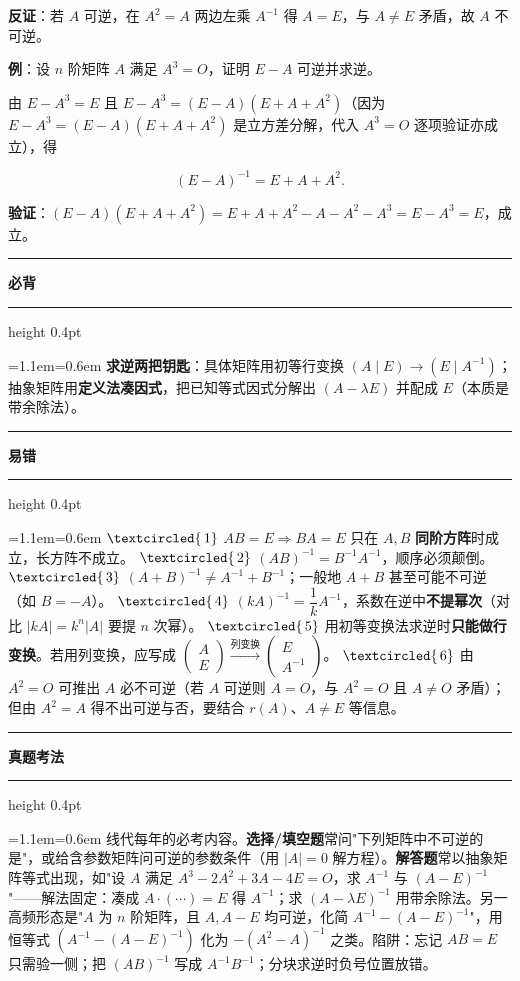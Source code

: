 \documentclass[11pt,openany,UTF8]{ctexbook}
\newcommand{\circled}[1]{\textcircled{\scriptsize\,#1}}
\newcommand{\callouthead}[2]{%
  \par\addvspace{7pt}\noindent
  {\color{#1}\rule[-0.15em]{3pt}{1.05em}}\hspace{0.5em}%
  {\bfseries\color{#1}#2}\par\nobreak\vspace{-0.35em}%
  {\color{rulesep}\hrule height 0.4pt}\nobreak\vspace{0.45em}%
  \begingroup\small\setlength{\parindent}{0pt}%
  \leftskip=1.1em\rightskip=0.6em\noindent\ignorespaces}
\newcommand{\calloutend}{\par\endgroup\addvspace{7pt}}
\newenvironment{callkey}[1]{\callouthead{keybar}{#1}}{\calloutend}
\newenvironment{callwarn}[1]{\callouthead{warnbar}{#1}}{\calloutend}
\newenvironment{callexam}[1]{\callouthead{exambar}{#1}}{\calloutend}
\begin{document}
\textbf{反证}：若 $A$ 可逆，在 $A^2=A$ 两边左乘 $A^{-1}$ 得 $A=E$，与 $A\ne E$ 矛盾，故 $A$ 不可逆。

\textbf{例}：设 $n$ 阶矩阵 $A$ 满足 $A^3=O$，证明 $E-A$ 可逆并求逆。

由 $E-A^3=E$ 且 $E-A^3=(E-A)(E+A+A^2)$（因为 $E-A^3=(E-A)(E+A+A^2)$ 是立方差分解，代入 $A^3=O$ 逐项验证亦成立），得

\[(E-A)^{-1}=E+A+A^2 .\]

\textbf{验证}：$(E-A)(E+A+A^2)=E+A+A^2-A-A^2-A^3=E-A^3=E$，成立。

\begin{callkey}{必背}
\textbf{求逆两把钥匙}：具体矩阵用初等行变换 $(A\mid E)\to(E\mid A^{-1})$；抽象矩阵用\textbf{定义法凑因式}，把已知等式因式分解出 $(A-\lambda E)$ 并配成 $E$（本质是带余除法）。

\end{callkey}

\begin{callwarn}{易错}
$\circled{1}$ $AB=E\Rightarrow BA=E$ 只在 $A,B$ \textbf{同阶方阵}时成立，长方阵不成立。 $\circled{2}$ $(AB)^{-1}=B^{-1}A^{-1}$，顺序必须颠倒。 $\circled{3}$ $(A+B)^{-1}\ne A^{-1}+B^{-1}$；一般地 $A+B$ 甚至可能不可逆（如 $B=-A$）。 $\circled{4}$ $(kA)^{-1}=\dfrac{1}{k}A^{-1}$，系数在逆中\textbf{不提幂次}（对比 $\vert kA\vert=k^n\vert A\vert$ 要提 $n$ 次幂）。 $\circled{5}$ 用初等变换法求逆时\textbf{只能做行变换}。若用列变换，应写成 $\begin{pmatrix}A\\E\end{pmatrix}\xrightarrow{\text{列变换}}\begin{pmatrix}E\\A^{-1}\end{pmatrix}$。 $\circled{6}$ 由 $A^2=O$ 可推出 $A$ 必不可逆（若 $A$ 可逆则 $A=O$，与 $A^2=O$ 且 $A\ne O$ 矛盾）；但由 $A^2=A$ 得不出可逆与否，要结合 $r(A)$、$A\ne E$ 等信息。

\end{callwarn}

\begin{callexam}{真题考法}
线代每年的必考内容。\textbf{选择/填空题}常问"下列矩阵中不可逆的是"，或给含参数矩阵问可逆的参数条件（用 $\vert A\vert=0$ 解方程）。\textbf{解答题}常以抽象矩阵等式出现，如"设 $A$ 满足 $A^3-2A^2+3A-4E=O$，求 $A^{-1}$ 与 $(A-E)^{-1}$"——解法固定：凑成 $A\cdot(\cdots)=E$ 得 $A^{-1}$；求 $(A-\lambda E)^{-1}$ 用带余除法。另一高频形态是"$A$ 为 $n$ 阶矩阵，且 $A,A-E$ 均可逆，化简 $A^{-1}-(A-E)^{-1}$"，用恒等式 $(A^{-1}-(A-E)^{-1})$ 化为 $-(A^2-A)^{-1}$ 之类。陷阱：忘记 $AB=E$ 只需验一侧；把 $(AB)^{-1}$ 写成 $A^{-1}B^{-1}$；分块求逆时负号位置放错。

\end{callexam}
\end{document}
